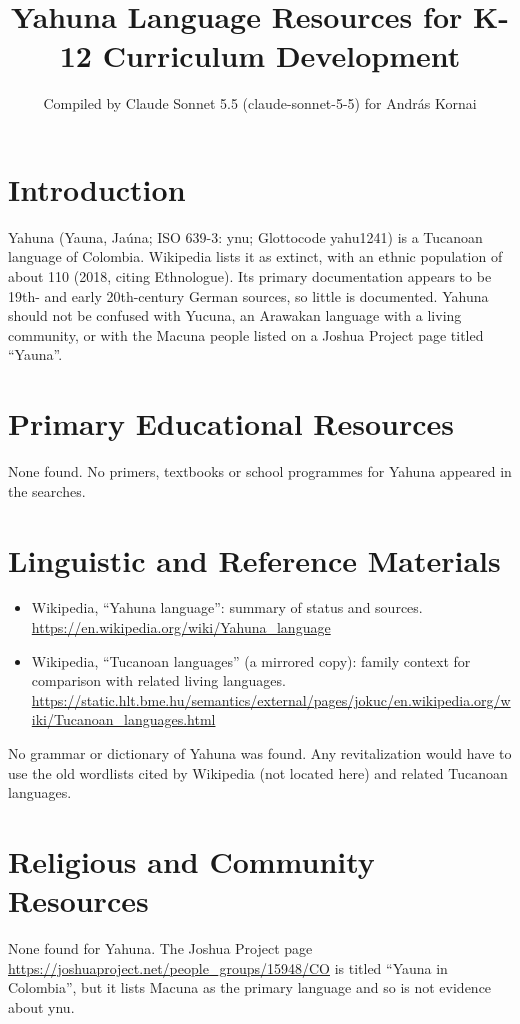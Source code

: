 \documentclass[12pt]{article}
\title{Yahuna Language Resources for K-12 Curriculum Development}
\author{Compiled by Claude Sonnet 5.5 (claude-sonnet-5-5) for Andr\'as Kornai}
\date{}
\begin{document}
\maketitle

\section{Introduction}
Yahuna (Yauna, Ja\'una; ISO 639-3: ynu; Glottocode yahu1241) is a Tucanoan language of Colombia. Wikipedia lists it as extinct, with an ethnic population of about 110 (2018, citing Ethnologue). Its primary documentation appears to be 19th- and early 20th-century German sources, so little is documented. Yahuna should not be confused with Yucuna, an Arawakan language with a living community, or with the Macuna people listed on a Joshua Project page titled ``Yauna''.

\section{Primary Educational Resources}
None found. No primers, textbooks or school programmes for Yahuna appeared in the searches.

\section{Linguistic and Reference Materials}
\begin{itemize}
\item Wikipedia, ``Yahuna language'': summary of status and sources. \url{https://en.wikipedia.org/wiki/Yahuna_language}
\item Wikipedia, ``Tucanoan languages'' (a mirrored copy): family context for comparison with related living languages. \url{https://static.hlt.bme.hu/semantics/external/pages/jokuc/en.wikipedia.org/wiki/Tucanoan_languages.html}
\end{itemize}
No grammar or dictionary of Yahuna was found. Any revitalization would have to use the old wordlists cited by Wikipedia (not located here) and related Tucanoan languages.

\section{Religious and Community Resources}
None found for Yahuna. The Joshua Project page \url{https://joshuaproject.net/people_groups/15948/CO} is titled ``Yauna in Colombia'', but it lists Macuna as the primary language and so is not evidence about ynu.
\end{document}
